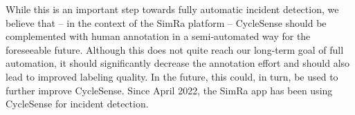 While this is an important step towards fully automatic incident detection, we believe that -- in the context of the SimRa platform -- CycleSense should be complemented with human annotation in a semi-automated way for the foreseeable future.
Although this does not quite reach our long-term goal of full automation, it should significantly decrease the annotation effort and should also lead to improved labeling quality.
In the future, this could, in turn, be used to further improve CycleSense.
Since April 2022, the SimRa app has been using CycleSense for incident detection.


